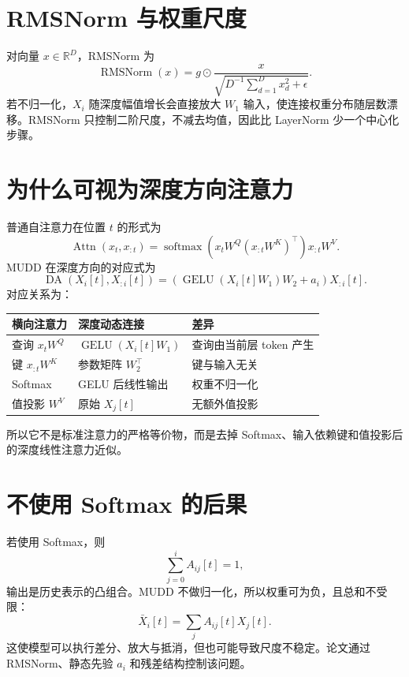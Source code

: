 \documentclass[UTF8,12pt,a4paper,fontset=none]{ctexart}
\numberwithin{equation}{section}
\newcommand{\R}{\mathbb{R}}
\newcommand{\softmax}{\operatorname{softmax}}
\begin{document}
\section{RMSNorm 与权重尺度}
对向量 $x\in\R^D$，RMSNorm 为
\begin{equation}
 \operatorname{RMSNorm}(x)=g\odot\frac{x}{\sqrt{D^{-1}\sum_{d=1}^{D}x_d^2+\epsilon}}.
\end{equation}
若不归一化，$X_i$ 随深度幅值增长会直接放大 $W_1$ 输入，使连接权重分布随层数漂移。RMSNorm 只控制二阶尺度，不减去均值，因此比 LayerNorm 少一个中心化步骤。

\section{为什么可视为深度方向注意力}
普通自注意力在位置 $t$ 的形式为
\begin{equation}
 \operatorname{Attn}(x_t,x_{:t})
 =\softmax\left(x_tW^Q(x_{:t}W^K)^\top\right)x_{:t}W^V.
\end{equation}
MUDD 在深度方向的对应式为
\begin{equation}
 \operatorname{DA}(X_i[t],X_{:i}[t])
 =\left(\operatorname{GELU}(X_i[t]W_1)W_2+a_i\right)X_{:i}[t].
\end{equation}
对应关系为：
\begin{center}
\begin{tabular}{lll}
\toprule
横向注意力 & 深度动态连接 & 差异\\
\midrule
查询 $x_tW^Q$ & $\operatorname{GELU}(X_i[t]W_1)$ & 查询由当前层 token 产生\\
键 $x_{:t}W^K$ & 参数矩阵 $W_2^\top$ & 键与输入无关\\
Softmax & GELU 后线性输出 & 权重不归一化\\
值投影 $W^V$ & 原始 $X_j[t]$ & 无额外值投影\\
\bottomrule
\end{tabular}
\end{center}
所以它不是标准注意力的严格等价物，而是去掉 Softmax、输入依赖键和值投影后的深度线性注意力近似。

\section{不使用 Softmax 的后果}
若使用 Softmax，则
\begin{equation}
 \sum_{j=0}^{i}A_{ij}[t]=1,
\end{equation}
输出是历史表示的凸组合。MUDD 不做归一化，所以权重可为负，且总和不受限：
\begin{equation}
 \bar X_i[t]=\sum_j A_{ij}[t]X_j[t].
\end{equation}
这使模型可以执行差分、放大与抵消，但也可能导致尺度不稳定。论文通过 RMSNorm、静态先验 $a_i$ 和残差结构控制该问题。
\end{document}
